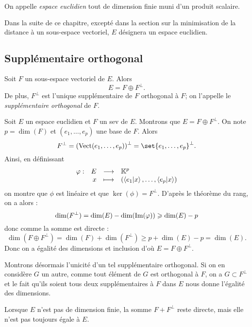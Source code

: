 \documentclass{magnolia}
\begin{document}
\begin{definition}[utile=-3]
On appelle \emph{espace euclidien} tout \Rev de dimension finie muni d'un produit
scalaire.
\end{definition}

\begin{remarqueUnique}
\remarque Dans la suite de ce chapitre, excepté dans la section sur la minimisation de la distance à un
  sous-espace vectoriel, $E$ désignera un espace euclidien.  
\end{remarqueUnique}



\subsection{Supplémentaire orthogonal}

\begin{definition}[utile=2]
Soit $F$ un sous-espace vectoriel de $E$. Alors
\[E=F\oplus F^{\perp}.\]
De plus, $F^\perp$ est l'unique supplémentaire de $F$ orthogonal à $F$; on
l'appelle le \emph{supplémentaire orthogonal} de $F$.
\end{definition}

\begin{preuve}
Soit $E$ un espace euclidien et $F$ un sev de $E$. Montrons que $E=F\oplus F^{\perp}$. On note $p=\dim(F)$ et $(e_1,\ldots,e_p)$ une base de $F$. Alors $$F^\perp=\p{\vect(e_1,\ldots,e_p)}^\perp=\set{e_1,\ldots,e_p}^\perp.$$
Ainsi, en définissant $$\begin{array}[t]{lrcl} \displaystyle{\varphi} : & \displaystyle{E} & \longrightarrow & \displaystyle{\ensuremath{\mathbb{K}}^p} \\ & \displaystyle{x} & \longmapsto & \displaystyle{(\left\langle {e_1}\middle|{x}\right\rangle,\ldots,\left\langle {e_p}\middle|{x}\right\rangle)} \end{array}$$ on montre que $\phi$ est linéaire et que $\ker(\phi)=F^\perp$. D'après le théorème du rang, on a alors :
$$\dim(F^\perp)=\dim(E)-\dim(\operatorname{Im}(\varphi))\geqslant \dim(E)-p$$ donc comme la somme est directe :
$$\dim(F\oplus F^{\perp})=\dim(F)+\dim(F^{\perp})\geq p+\dim(E)-p=\dim(E).$$ Donc on a égalité des dimensions et inclusion d'où $E=F\oplus F^{\perp}$.

Montrons désormais l'unicité d'un tel supplémentaire orthogonal. Si on en considère $G$ un autre, comme tout élément de $G$ est orthogonal à $F$, on a $G\subset F^\perp$ et le fait qu'ils soient tous deux supplémentaires à $F$ dans $E$ nous donne l'égalité des dimensions.
\end{preuve}


\begin{remarqueUnique}
\remarque Lorsque $E$ n'est pas de dimension finie, la somme $F+ F^\perp$ reste
  directe, mais elle n'est pas toujours égale à $E$.
\end{remarqueUnique}
\end{document}
